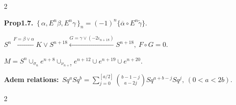 \documentclass[10pt, leqno]{ltjsarticle}
\newcommand{\todai}[2][]{\{\,#2\,\}_{#1}}      %
\newcommand{\gen}[1]{\{#1\}}       %
\newcommand{\sq}[1]{Sq^{#1}}
\numberwithin{equation}{section}
\theoremstyle{plain}
\theoremstyle{definition}
\theoremstyle{remark}
\begin{document}
\begin{paracol}{2}
\switchcolumn

\noindent
\textbf{Prop1.7.}\
\(\todai[n]{\alpha, E^n\beta, E^n\gamma}
= (-1)^n\gen{\overline{\alpha}\circ E^n\widetilde{\gamma}}\).

\noindent
\(S^n\xleftarrow{F = \beta\vee\alpha}
K\vee S^{n+18}\xleftarrow{G = \gamma\vee(-2\iota_{n+18})}S^{n+18},\
F\circ G = 0\).

\noindent
\(M = S^n\cup_{\sigma_n}e^{n+8}\cup_{\nu_{n+7}}e^{n+12}
\cup e^{n+19}\cup e^{n+20}\).

\noindent
\textbf{Adem relations:}\ 
\(\sq{a}\sq{b} = \sum_{j=0}^{[a/2]}\binom{b-1-j}{a-2j}
\sq{a+b-j}\sq{j},\ (0<a<2b)\).



\end{paracol}

\begin{paracol}{2}


\end{paracol}
\end{document}
